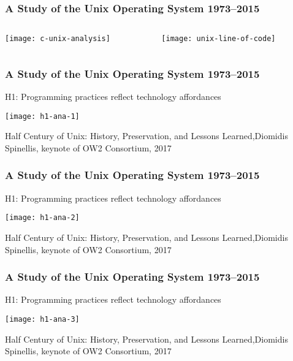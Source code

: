 \begin{frame}[plain]
	\frametitle{A Study of the Unix Operating System 1973–2015}
	
	
	
	\begin{columns}
		
		\begin{column}{.5\textwidth}
			\texttt{[image: c-unix-analysis]}
		\end{column}
		
		\begin{column}{.5\textwidth}
			
			\texttt{[image: unix-line-of-code]}
			
		\end{column}
		
	\end{columns}
	
	
\end{frame}

\begin{frame}[plain]
	\frametitle{A Study of the Unix Operating System 1973–2015}
	\centering
H1: Programming practices reflect
technology affordances

	\texttt{[image: h1-ana-1]}
	
	\tiny Half Century of Unix:
	History, Preservation, and
	Lessons Learned,Diomidis Spinellis, keynote of OW2 Consortium, 2017
\end{frame}	


\begin{frame}[plain]
	\frametitle{A Study of the Unix Operating System 1973–2015}
	\centering
	H1: Programming practices reflect
	technology affordances
	
	\texttt{[image: h1-ana-2]}

	\tiny Half Century of Unix:
History, Preservation, and
Lessons Learned,Diomidis Spinellis, keynote of OW2 Consortium, 2017
	
\end{frame}	


\begin{frame}[plain]
	\frametitle{A Study of the Unix Operating System 1973–2015}
	\centering
	H1: Programming practices reflect
	technology affordances
	
	\texttt{[image: h1-ana-3]}

	\tiny Half Century of Unix:
History, Preservation, and
Lessons Learned,Diomidis Spinellis, keynote of OW2 Consortium, 2017
	
\end{frame}	


